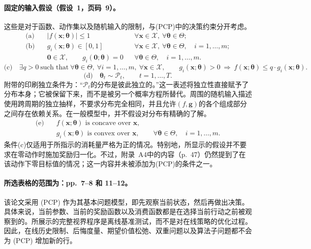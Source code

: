 \documentclass{article}
\begin{document}
\paragraph{固定的输入假设（假设~1，页码~9）。}
这些是对于函数、动作集以及随机输入的限制，与(PCP)中的决策约束分开考虑。
\begin{align*}
\text{(a)}\quad
&|f(\boldsymbol{x};\boldsymbol{\theta})|\le 1
&&\forall\boldsymbol{x}\in\mathcal{X},\ \forall\boldsymbol{\theta}\in\Theta;\\
\text{(b)}\quad
&g_i(\boldsymbol{x};\boldsymbol{\theta})\in[0,1]
&&\forall\boldsymbol{x}\in\mathcal{X},\ \forall\boldsymbol{\theta}\in\Theta,
\quad i=1,\ldots,m;\\
&\boldsymbol{0}\in\mathcal{X},\qquad g_i(\boldsymbol{0};\boldsymbol{\theta})=0
&&\forall\boldsymbol{\theta}\in\Theta,\quad i=1,\ldots,m.
\end{align*}
\[
\text{(c)}\quad
\exists q>0\ \text{such that}\ 
\forall\boldsymbol{\theta}\in\Theta,\ \forall i=1,\ldots,m,
\ \forall\boldsymbol{x}\in\mathcal{X},\qquad
 g_i(\boldsymbol{x};\boldsymbol{\theta})>0
\ \Longrightarrow\ 
 f(\boldsymbol{x};\boldsymbol{\theta})\le q\cdot g_i(\boldsymbol{x};\boldsymbol{\theta}).
\]
\[
\text{(d)}\quad
\boldsymbol{\theta}_t\sim\mathcal{P}_t,\qquad t=1,\ldots,T.
\]
附带的印刷独立条件为：“$\mathcal{P}_t$的分布是彼此独立的。”这一表述将独立性直接赋予了分布本身；它被保留下来，而不是被另一个概率方程所替代。周围的随机输入描述使用跨周期的独立抽样，不要求分布完全相同，并且允许$(f,\boldsymbol{g})$的各个组成部分之间存在依赖关系。在一般模型中，并不假设对分布有精确的了解。
\[
\begin{aligned}
\text{(e)}\quad
&f(\boldsymbol{x};\boldsymbol{\theta})\text{ is concave over }\boldsymbol{x},\\
&g_i(\boldsymbol{x};\boldsymbol{\theta})\text{ is convex over }\boldsymbol{x},
\qquad\forall\boldsymbol{\theta}\in\Theta,\quad i=1,\ldots,m.
\end{aligned}
\]
条件(c)仅适用于所指示的消耗量严格为正的情况。特别地，所显示的假设并不要求在零动作时施加奖励归一化。不过，附录~A4中的内容（p.~47）仍然提到了在该动作下零目标值的情况；这一内容并未被添加为(PCP)的条件之一。

\paragraph{所选表格的范围为：pp.~7–8 和 11–12。}
该论文采用 (PCP) 作为其基本问题模型，即先观察当前状态，然后再做出决策。具体来说，当前参数、当前的奖励函数以及消费函数都是在选择当前行动之前被观察到的。所展示的完整视界程序是离线基准测试，而不是对在线策略的优化过程。因此，在线历史限制、后悔度量、期望价值松弛、双重问题以及算法子问题都不会为 (PCP) 增加新的行。
\end{document}
